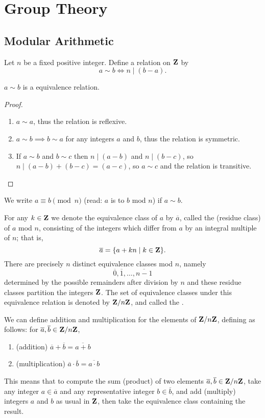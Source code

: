 \chapter{Group Theory}\label{chap:group-theory}
\section{Modular Arithmetic}
Let $n$ be a fixed positive integer. Define a relation on $\mathbf Z$ by
\[a\sim b\iff n\mid(b-a).\]
\begin{proposition}
$a\sim b$ is a equivalence relation.
\end{proposition}
\begin{proof} \
\begin{enumerate}[label=(\arabic*)]
\item $a\sim a$, thus the relation is reflexive.
\item $a\sim b\implies b\sim a$ for any integers $a$ and $b$, thus the relation is symmetric.
\item If $a\sim b$ and $b\sim c$ then $n\mid(a-b)$ and $n\mid(b-c)$, so $n\mid(a-b)+(b-c)=(a-c)$, so $a\sim c$ and the relation is transitive.
\end{enumerate}
\end{proof}

We write $a\equiv b\pmod n$ (read: $a$ is  to $b$ mod $n$) if $a\sim b$.

For any $k\in\mathbf Z$ we denote the equivalence class of $a$ by $\overline{a}$, called the  (residue class) of $a$ mod $n$, consisting of the integers which differ from $a$ by an integral multiple of $n$; that is,
\[\overline{a}=\{a+kn\mid k\in\mathbf Z\}.\]
There are precisely $n$ distinct equivalence classes mod $n$, namely
\[\overline{0},\overline{1},\dots,\overline{n-1}\]
determined by the possible remainders after division by $n$ and these residue classes partition the integers $\mathbf Z$. The set of equivalence classes under this equivalence relation is denoted by $\mathbf Z/n\mathbf Z$, and called the .

We can define addition and multiplication for the elements of $\mathbf Z/n\mathbf Z$, defining  as follows: for $\overline{a},\overline{b}\in\mathbf Z/n\mathbf Z$,
\begin{enumerate}
\item (addition) $\overline{a}+\overline{b}=\overline{a+b}$
\item (multiplication) $\overline{a}\cdot\overline{b}=\overline{a\cdot b}$
\end{enumerate}
This means that to compute the sum (product) of two elements $\overline{a},\overline{b}\in\mathbf Z/n\mathbf Z$, take any  integer $a\in\overline{a}$ and any representative integer $b\in\overline{b}$, and add (multiply) integers $a$ and $b$ as usual in $\mathbf Z$, then take the equivalence class containing the result.

